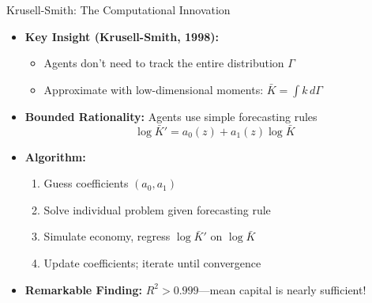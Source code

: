 \begin{frame}{Krusell-Smith: The Computational Innovation}
\begin{itemize}
\item \textbf{Key Insight (Krusell-Smith, 1998):}
\begin{itemize}
    \item Agents don't need to track the entire distribution $\Gamma$
    \item Approximate with low-dimensional moments: $\bar{K} = \int k \, d\Gamma$
\end{itemize}

\medskip
\item \textbf{Bounded Rationality:} Agents use simple forecasting rules
\[
\log \bar{K}' = a_0(z) + a_1(z) \log \bar{K}
\]

\medskip
\item \textbf{Algorithm:}
\begin{enumerate}
    \item Guess coefficients $(a_0, a_1)$
    \item Solve individual problem given forecasting rule
    \item Simulate economy, regress $\log \bar{K}'$ on $\log \bar{K}$
    \item Update coefficients; iterate until convergence
\end{enumerate}

\medskip
\item \textbf{Remarkable Finding:} $R^2 > 0.999$---mean capital is nearly sufficient!
\end{itemize}
\end{frame}

